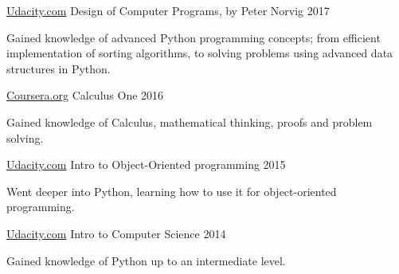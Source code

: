 

\begin{cventries}

  \cventry
    {\hyperlink{Udacity.com}{Udacity.com}} %
    {Design of Computer Programs, by Peter Norvig} %
    {} %
    {2017} %
    {
      \begin{cvitems} %
        \item {Gained knowledge of advanced Python programming concepts; from efficient implementation of sorting algorithms, to solving problems using advanced data structures in Python.}
      \end{cvitems}
    }
  \cventry
    {\hyperlink{Coursera.org}{Coursera.org}} %
    {Calculus One} %
    {} %
    {2016} %
    {
      \begin{cvitems} %
        \item {Gained knowledge of Calculus, mathematical thinking, proofs and problem solving.}
      \end{cvitems}
    }
  \cventry
    {\hyperlink{Udacity.com}{Udacity.com}} %
    {Intro to Object-Oriented programming} %
    {} %
    {2015} %
    {
      \begin{cvitems} %
        \item {Went deeper into Python, learning how to use it for object-oriented programming.}
      \end{cvitems}
    }
  \cventry
    {\hyperlink{Udacity.com}{Udacity.com}} %
    {Intro to Computer Science} %
    {} %
    {2014} %
    {
      \begin{cvitems} %
        \item {Gained knowledge of Python up to an intermediate level.}
      \end{cvitems}
    }


\end{cventries}
